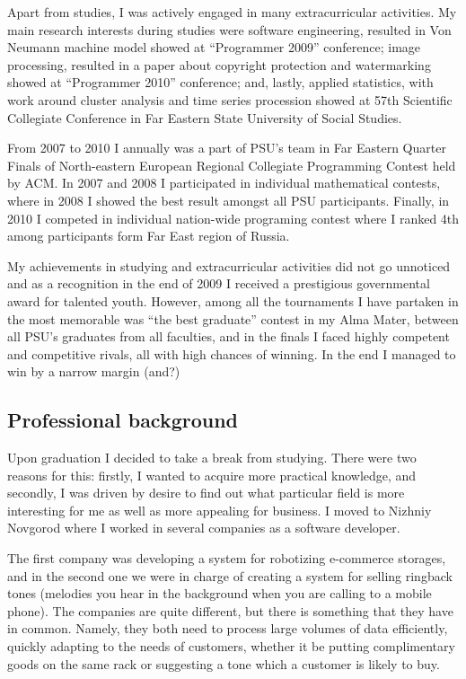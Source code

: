 \documentclass[a4paper,14pt]{extarticle}
\begin{document}
Apart from studies, I was actively engaged in many extracurricular activities. My main research interests during studies were software engineering, resulted in Von Neumann machine model showed at ``Programmer 2009'' conference; image processing, resulted in a paper about copyright protection and watermarking showed at ``Programmer 2010'' conference; and, lastly, applied statistics, with work around cluster analysis and time series procession showed at 57th Scientific Collegiate Conference in Far Eastern State University of Social Studies.

From 2007 to 2010 I annually was a part of PSU's team in Far Eastern Quarter Finals of North-eastern European Regional Collegiate Programming Contest held by ACM. In 2007 and 2008 I participated in individual mathematical contests, where in 2008 I showed the best result amongst all PSU participants. Finally, in 2010 I competed in individual nation-wide programing contest where I ranked 4th among participants form Far East region of Russia.

My achievements in studying and extracurricular activities did not go unnoticed and as a recognition in the end of 2009 I received a prestigious governmental award for talented youth. However, among all the tournaments I have partaken in the most memorable was ``the best graduate'' contest in my Alma Mater, between all PSU's graduates from all faculties, and in the finals I faced highly competent and competitive rivals, all with high chances of winning. In the end I managed to win by a narrow margin (and?)

\subsection*{Professional background}

Upon graduation I decided to take a break from studying. There were two reasons for this: firstly, I wanted to acquire more practical knowledge, and secondly, I was driven by desire to find out what particular field is more interesting for me as well as more appealing for business. I moved to Nizhniy Novgorod where I worked in several companies as a software developer.

The first company was developing a system for robotizing e-commerce storages, and in the second one we were in charge of creating a system for selling ringback tones (melodies you hear in the background when you are calling to a mobile phone). The companies are quite different, but there is something that they have in common. Namely, they both need to process large volumes of data efficiently, quickly adapting to the needs of customers, whether it be putting complimentary goods on the same rack or suggesting a tone which a customer is likely to buy.
\end{document}
